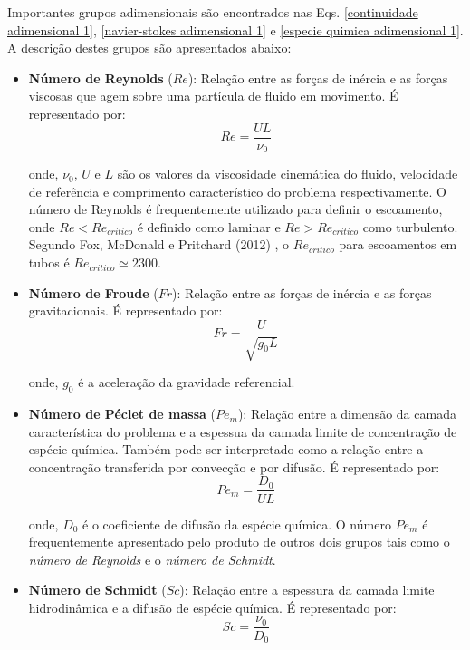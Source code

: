 \newpage
Importantes grupos adimensionais são encontrados nas
Eqs. \ref{continuidade adimensional 1}, \ref{navier-stokes adimensional 1}
e \ref{especie quimica adimensional 1}. 
A descrição destes grupos são apresentados abaixo:

\begin{itemize}
 \item \textbf{Número de Reynolds} ($Re$): 
 Relação entre as forças de inércia e as forças viscosas
 que agem sobre uma partícula de fluido em movimento.
 É representado por:
 \begin{equation}
  Re = \frac{UL}{\nu_{0}}
 \end{equation}
 
 onde, $\nu_{0}$, $U$ e $L$ são os valores da 
 viscosidade cinemática do fluido, 
 velocidade de referência
 e comprimento característico do problema
 respectivamente. O número de Reynolds é
 frequentemente utilizado para definir o
 escoamento, onde $Re < Re_{critico}$ é
 definido como laminar e $Re > Re_{critico}$
 como turbulento. Segundo Fox, McDonald e Pritchard (2012) \cite{fox2012}, o
 $Re_{critico}$ para escoamentos em tubos é
 $Re_{critico} \simeq 2300$.

 \item \textbf{Número de Froude} ($Fr$): 
 Relação entre as forças de inércia e as forças gravitacionais.
 É representado por:
 \begin{equation}
  Fr = \frac{U}{\sqrt{g_{0}L}}
 \end{equation}
 
 onde, $g_{0}$ é a aceleração da gravidade
 referencial.

 \item \textbf{Número de Péclet de massa} ($Pe_{m}$): 
 Relação entre a dimensão da camada característica do
 problema e a espessua da camada limite de
 concentração de espécie química. Também pode ser
 interpretado como a relação entre a concentração
 transferida por convecção e por difusão.
 É representado por:
 \begin{equation}
  Pe_{m} = \frac{D_{0}}{UL}
 \end{equation}
 
 onde, $D_{0}$ é o coeficiente de difusão da
 espécie química. O número $Pe_{m}$ é frequentemente
 apresentado pelo produto de outros dois grupos tais
 como o \textit{número de Reynolds} e o \textit{número de Schmidt}.

 \newpage
 \item \textbf{Número de Schmidt} ($Sc$): 
 Relação entre a espessura da camada limite hidrodinâmica
 e a difusão de espécie química.
 É representado por:
 \begin{equation}
  Sc = \frac{\nu_{0}}{D_{0}}
 \end{equation}
\end{itemize}

